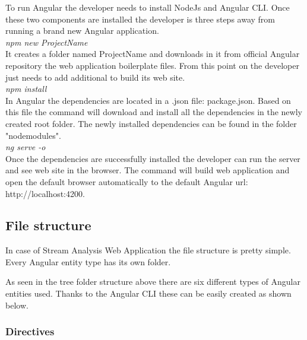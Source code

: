 To run Angular the developer needs to install NodeJs and Angular CLI. Once these two components are installed the developer is three steps away from running a brand new Angular application.\\

\textit{npm new ProjectName}\\

It creates a folder named ProjectName and downloads in it from official Angular repository the web application boilerplate files. From this point on the developer just needs to add additional to build its web site.\\

\textit{npm install}\\

In Angular the dependencies are located in a .json file: package.json. Based on this file the command will download and install all the dependencies in the newly created root folder. The newly installed dependencies can be found in the folder "nodemodules".\\

\textit{ng serve -o}\\

Once the dependencies are successfully installed the developer can run the server and see web site in the browser. The command will build web application and open the default browser automatically to the default Angular url: http://localhost:4200.\\

\subsection{File structure}
\label{chap:04:01:02}

In case of Stream Analysis Web Application the file structure is pretty simple. Every Angular entity type has its own folder.\\


As seen in the tree folder structure above there are six different types of Angular entities used. Thanks to the Angular CLI these can be easily created as shown below.

\subsubsection{Directives}
\label{chap:04:01:02:01}

